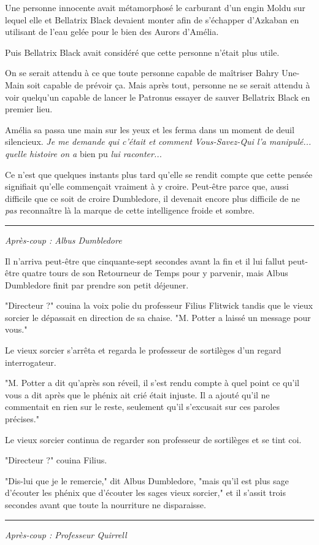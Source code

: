 Une personne innocente avait métamorphosé le carburant d'un engin Moldu sur lequel elle et Bellatrix Black devaient monter afin de s'échapper d'Azkaban en utilisant de l'eau gelée pour le bien des Aurors d'Amélia.

Puis Bellatrix Black avait considéré que cette personne n'était plus utile.

On se serait attendu à ce que toute personne capable de maîtriser Bahry Une-Main soit capable de prévoir ça. Mais après tout, personne ne se serait attendu à voir quelqu'un capable de lancer le Patronus essayer de sauver Bellatrix Black en premier lieu.

Amélia sa passa une main sur les yeux et les ferma dans un moment de deuil silencieux. \emph{Je me demande qui c'était et comment Vous-Savez-Qui l'a manipulé... quelle histoire on a } bien pu \emph{lui raconter...} 

Ce n'est que quelques instants plus tard qu'elle se rendit compte que cette pensée signifiait qu'elle commençait vraiment à y croire. Peut-être parce que, aussi difficile que ce soit de croire Dumbledore, il devenait encore plus difficile de ne \emph{pas}  reconnaître là la marque de cette intelligence froide et sombre.
\par\noindent\rule{\textwidth}{0.4pt}
\emph{Après-coup : Albus Dumbledore} 

Il n'arriva peut-être que cinquante-sept secondes avant la fin et il lui fallut peut-être quatre tours de son Retourneur de Temps pour y parvenir, mais Albus Dumbledore finit par prendre son petit déjeuner.

"Directeur ?" couina la voix polie du professeur Filius Flitwick tandis que le vieux sorcier le dépassait en direction de sa chaise. "M. Potter a laissé un message pour vous."

Le vieux sorcier s'arrêta et regarda le professeur de sortilèges d'un regard interrogateur.

"M. Potter a dit qu'après son réveil, il s'est rendu compte à quel point ce qu'il vous a dit après que le phénix ait crié était injuste. Il a ajouté qu'il ne commentait en rien sur le reste, seulement qu'il s'excusait sur ces paroles précises."

Le vieux sorcier continua de regarder son professeur de sortilèges et se tint coi.

"Directeur ?" couina Filius.

"Dis-lui que je le remercie," dit Albus Dumbledore, "mais qu'il est plus sage d'écouter les phénix que d'écouter les sages vieux sorcier," et il s'assit trois secondes avant que toute la nourriture ne disparaisse.
\par\noindent\rule{\textwidth}{0.4pt}
\emph{Après-coup : Professeur Quirrell} 

